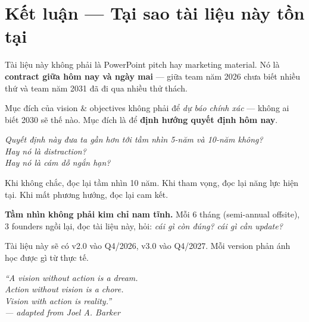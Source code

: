 \documentclass[11pt,a4paper]{article}
\begin{document}
\clearpage

\section*{Kết luận --- Tại sao tài liệu này tồn tại}

Tài liệu này không phải là PowerPoint pitch hay marketing material. Nó là
\textbf{contract giữa hôm nay và ngày mai} --- giữa team năm 2026 chưa biết
nhiều thứ và team năm 2031 đã đi qua nhiều thử thách.

Mục đích của vision \& objectives không phải để \textit{dự báo chính xác} ---
không ai biết 2030 sẽ thế nào. Mục đích là để \textbf{định hướng quyết định
hôm nay}.

\begin{visionbox}[title=Test cho mọi quyết định lớn]
\textit{Quyết định này đưa ta gần hơn tới tầm nhìn 5-năm và 10-năm không?\\
Hay nó là distraction?\\
Hay nó là cám dỗ ngắn hạn?}
\end{visionbox}

Khi không chắc, đọc lại tầm nhìn 10 năm. Khi tham vọng, đọc lại năng lực
hiện tại. Khi mất phương hướng, đọc lại cam kết.

\textbf{Tầm nhìn không phải kim chỉ nam tĩnh.} Mỗi 6 tháng (semi-annual offsite),
3 founders ngồi lại, đọc tài liệu này, hỏi: \textit{cái gì còn đúng? cái gì cần
update?}

Tài liệu này sẽ có v2.0 vào Q4/2026, v3.0 vào Q4/2027. Mỗi version phản ánh
học được gì từ thực tế.

\vfill

\begin{center}
\small\itshape\color{mid}
``A vision without action is a dream. \\
Action without vision is a chore. \\
Vision with action is reality.''\\
--- adapted from Joel A. Barker
\end{center}
\end{document}
